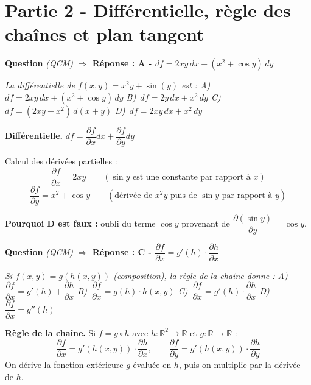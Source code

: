 \documentclass[11pt,a4paper]{article}
\newcounter{qnum}
\newcommand{\qtitre}[2]{%
  \stepcounter{qnum}%
  \medskip\noindent
  \textbf{\color{bleutexte}Question \theqnum}\enspace
  \textit{(#1)}\enspace
  \textcolor{vertok}{\textbf{$\Rightarrow$ Réponse : #2}}
  \par\smallskip
}
\newcommand{\qenonce}[1]{%
  \begin{mdframed}[backgroundcolor=grisbox, linewidth=0pt,
    innerleftmargin=8pt, innerrightmargin=8pt,
    innertopmargin=5pt, innerbottommargin=5pt,
    skipabove=2pt, skipbelow=4pt]
  \small\textit{#1}
  \end{mdframed}
}
\begin{document}
\section{Partie 2 - Différentielle, règle des chaînes et plan tangent}

\qtitre{QCM}{A - $df = 2xy\,dx + (x^2+\cos y)\,dy$}
\qenonce{La différentielle de $f(x,y) = x^2 y + \sin(y)$ est :
\quad A)~$df = 2xy\,dx + (x^2+\cos y)\,dy$
\quad B)~$df = 2y\,dx + x^2\,dy$
\quad C)~$df = (2xy + x^2)\,d(x+y)$
\quad D)~$df = 2xy\,dx + x^2\,dy$}

\begin{methodebox}
\textbf{Différentielle.} $df = \dfrac{\partial f}{\partial x}dx + \dfrac{\partial f}{\partial y}dy$
\end{methodebox}

Calcul des dérivées partielles :
$$\frac{\partial f}{\partial x} = 2xy \qquad (\sin y \text{ est une constante par rapport à } x)$$
$$\frac{\partial f}{\partial y} = x^2 + \cos y \qquad (\text{dérivée de } x^2y \text{ puis de } \sin y \text{ par rapport à } y)$$

\textbf{Pourquoi D est faux :} oubli du terme $\cos y$ provenant de $\dfrac{\partial(\sin y)}{\partial y} = \cos y$.

\qtitre{QCM}{C - $\dfrac{\partial f}{\partial x} = g'(h)\cdot\dfrac{\partial h}{\partial x}$}
\qenonce{Si $f(x,y) = g(h(x,y))$ (composition), la règle de la chaîne donne :
\quad A)~$\dfrac{\partial f}{\partial x} = g'(h) + \dfrac{\partial h}{\partial x}$
\quad B)~$\dfrac{\partial f}{\partial x} = g(h)\cdot h(x,y)$
\quad C)~$\dfrac{\partial f}{\partial x} = g'(h)\cdot\dfrac{\partial h}{\partial x}$
\quad D)~$\dfrac{\partial f}{\partial x} = g''(h)$}

\begin{methodebox}
\textbf{Règle de la chaîne.} Si $f = g \circ h$ avec $h : \mathbb{R}^2 \to \mathbb{R}$ et $g : \mathbb{R} \to \mathbb{R}$ :
$$\frac{\partial f}{\partial x} = g'(h(x,y))\cdot\frac{\partial h}{\partial x}, \qquad \frac{\partial f}{\partial y} = g'(h(x,y))\cdot\frac{\partial h}{\partial y}$$
On dérive la fonction extérieure $g$ évaluée en $h$, puis on multiplie par la dérivée de $h$.
\end{methodebox}
\end{document}
